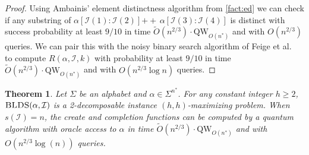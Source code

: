 \documentclass[12pt]{article}
\newcommand{\qw}{\mathrm{QW}}
\newcommand{\concat}{\ensuremath{+\!\!\!\!+\,}}
\newcommand{\Iset}{\mathcal{I}}
\newcommand{\blds}{\textsc{BLDS}}
\newtheorem{theorem}{Theorem}
\theoremstyle{definition}
\begin{document}
\begin{proof}
Using Ambainis' element distinctness algorithm from \cref{fact:ed} we can check if any substring of $\alpha[\Iset(1) \colon \Iset(2)] \concat \alpha[\Iset(3) \colon \Iset(4)]$ is distinct with success probability at least $9/10$ in time $\tilde O(n^{2/3}) \cdot \qw_{O(n^*)}$ and with $O(n^{2/3})$ queries.  We can pair this with the noisy binary search algorithm of Feige et al.\ \cite{FeigeRPU94} to compute $R(\alpha, \Iset, k)$ with probability at least $9/10$ in time $\tilde O(n^{2/3}) \cdot \qw_{O(n^*)}$ and with $O(n^{2/3} \log n)$ queries.
\end{proof}

\begin{theorem}
\label{thm:comp}
Let $\Sigma$ be an alphabet and $\alpha \in \Sigma^{n^*}$.
For any constant integer $h \ge 2$, $\blds(\alpha, \Iset)$ is a 2-decomposable instance $(h, h)$-maximizing problem.  
When $s(\Iset) = n$, the create and completion functions can be computed by a quantum algorithm with oracle access to $\alpha$ in time $\tilde O(n^{2/3}) \cdot \qw_{O(n^*)}$ and with $O(n^{2/3} \log(n))$ queries.
\end{theorem}
\end{document}

